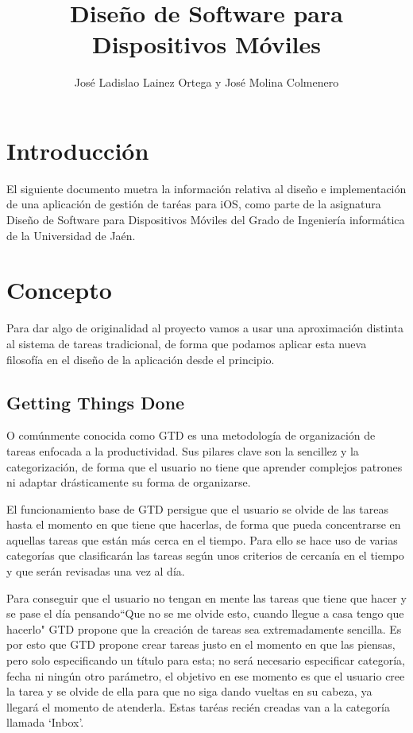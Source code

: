 \documentclass[parskip=half*]{scrartcl}
\title{Dise\~no de Software para Dispositivos M\'oviles}
\author{Jos\'e Ladislao Lainez Ortega y Jos\'e Molina Colmenero}
\begin{document}

\maketitle
\tableofcontents

\newpage


\section{Introducci\'on}
El siguiente documento muetra la informaci\'on relativa al dise\~no e implementaci\'on de una aplicaci\'on de gesti\'on de tar\'eas para iOS, como parte de la asignatura Dise\~no de Software para Dispositivos M\'oviles del Grado de Ingenier\'ia inform\'atica de la Universidad de Ja\'en.

\section{Concepto}
Para dar algo de originalidad al proyecto vamos a usar una aproximaci\'on distinta al sistema de tareas tradicional, de forma que podamos aplicar esta nueva filosof\'ia en el dise\~no de la aplicaci\'on desde el principio.

\subsection{Getting Things Done}
O com\'unmente conocida como GTD es una metodolog\'ia de organizaci\'on de tareas enfocada a la productividad. Sus pilares clave son la sencillez y la categorizaci\'on, de forma que el usuario no tiene que aprender complejos patrones ni adaptar dr\'asticamente su forma de organizarse.

El funcionamiento base de GTD persigue que el usuario se olvide de las tareas hasta el momento en que tiene que hacerlas, de forma que pueda concentrarse en aquellas tareas que est\'an m\'as cerca en el tiempo. Para ello se hace uso de varias categor\'ias que clasificar\'an las tareas seg\'un unos criterios de cercan\'ia en el tiempo y que ser\'an revisadas una vez al d\'ia.

Para conseguir que el usuario no tengan en mente las tareas que tiene que hacer y se pase el d\'ia pensando``Que no se me olvide esto, cuando llegue a casa tengo que hacerlo" GTD propone que la creaci\'on de tareas sea extremadamente sencilla. Es por esto que GTD propone crear tareas justo en el momento en que las piensas, pero solo especificando un t\'itulo para esta; no ser\'a necesario especificar categor\'ia, fecha ni ning\'un otro par\'ametro, el objetivo en ese momento es que el usuario cree la tarea y se olvide de ella para que no siga dando vueltas en su cabeza, ya llegar\'a el momento de atenderla. Estas tar\'eas reci\'en creadas van a la categor\'ia llamada `Inbox'.
\end{document}
